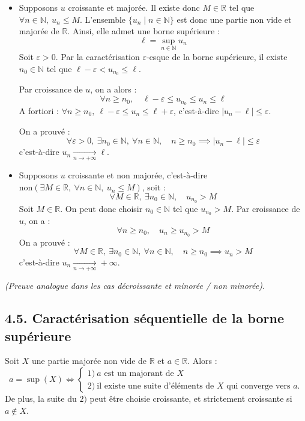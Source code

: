 \documentclass[a4paper,11pt]{article}
\newcommand{\R}{\mathbb{R}}
\newcommand{\N}{\mathbb{N}}
\begin{document}
\begin{demonstration}
\begin{itemize}
    \item Supposons $u$ croissante et majorée. Il existe donc $M \in \R$ tel que $\forall n \in \N, \ u_n \le M$. L'ensemble $\{ u_n \mid n \in \N \}$ est donc une partie non vide et majorée de $\R$. Ainsi, elle admet une borne supérieure :
    \[
    \ell = \sup_{n \in \N} u_n
    \]
    Soit $\varepsilon > 0$. Par la caractérisation $\varepsilon$-esque de la borne supérieure, il existe $n_0 \in \N$ tel que $\ell - \varepsilon < u_{n_0} \le \ell$.
    
    Par croissance de $u$, on a alors :
    \[
    \forall n \ge n_0, \quad \ell - \varepsilon \le u_{n_0} \le u_n \le \ell
    \]
    A fortiori : $\forall n \ge n_0, \ \ell - \varepsilon \le u_n \le \ell + \varepsilon$, c'est-à-dire $|u_n - \ell| \le \varepsilon$.
    
    On a prouvé :
    \[
    \forall \varepsilon > 0, \ \exists n_0 \in \N, \ \forall n \in \N, \quad n \ge n_0 \implies |u_n - \ell| \le \varepsilon
    \]
    c'est-à-dire $u_n \xrightarrow[n \to +\infty]{} \ell$.

    \item Supposons $u$ croissante et non majorée, c'est-à-dire $\text{non}(\exists M \in \R, \ \forall n \in \N, \ u_n \le M)$, soit :
    \[
    \forall M \in \R, \ \exists n_0 \in \N, \quad u_{n_0} > M
    \]
    Soit $M \in \R$. On peut donc choisir $n_0 \in \N$ tel que $u_{n_0} > M$. Par croissance de $u$, on a :
    \[
    \forall n \ge n_0, \quad u_n \ge u_{n_0} > M
    \]
    On a prouvé :
    \[
    \forall M \in \R, \ \exists n_0 \in \N, \ \forall n \in \N, \quad n \ge n_0 \implies u_n > M
    \]
    c'est-à-dire $u_n \xrightarrow[n \to +\infty]{} +\infty$.
\end{itemize}
\textit{(Preuve analogue dans les cas décroissante et minorée / non minorée).}
\end{demonstration}

\newpage
\subsection{4.5. Caractérisation séquentielle de la borne supérieure}

\begin{proposition}
Soit $X$ une partie majorée non vide de $\R$ et $a \in \R$. Alors :
\[
a = \sup(X) \iff
\begin{cases}
1)\ a \text{ est un majorant de } X \\[4pt]
2)\ \text{il existe une suite d'éléments de } X \text{ qui converge vers } a.
\end{cases}
\]
De plus, la suite du $2)$ peut être choisie croissante, et strictement croissante si $a \notin X$.
\end{proposition}
\end{document}
